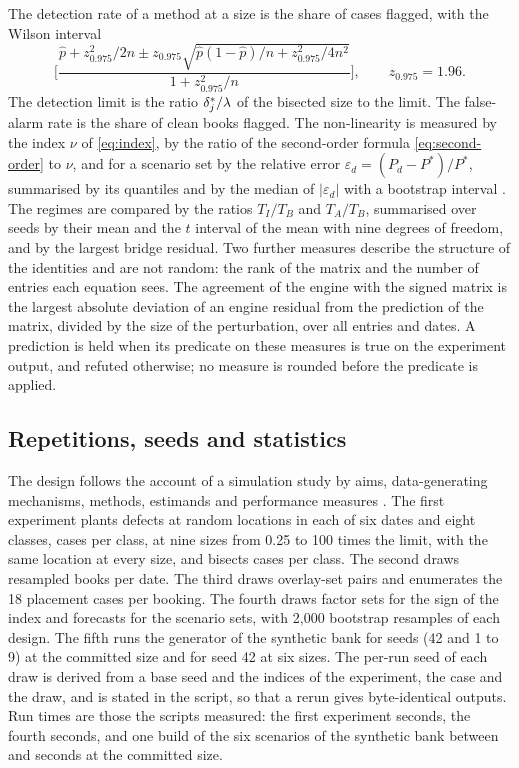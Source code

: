 The detection rate of a method at a size is the share of cases flagged, with the Wilson interval \citep{wilson1927,brown2001}
\begin{equation}
\Big[\frac{\hat p+z_{0.975}^{2}/2n\pm z_{0.975}\sqrt{\hat p(1-\hat p)/n+z_{0.975}^{2}/4n^{2}}}{1+z_{0.975}^{2}/n}\Big],\qquad z_{0.975}=1.96.
\label{eq:wilson}
\end{equation}
The detection limit is the ratio $\delta^{*}_j/\lambda$ of the bisected size to the limit.
The false-alarm rate is the share of clean books flagged.
The non-linearity is measured by the index $\nu$ of \eqref{eq:index}, by the ratio of the second-order formula \eqref{eq:second-order} to $\nu$, and for a scenario set by the relative error $\varepsilon_d=(P_d-P^{*})/P^{*}$, summarised by its quantiles and by the median of $|\varepsilon_d|$ with a bootstrap interval \citep{efron1979}.
The regimes are compared by the ratios $T_I/T_B$ and $T_A/T_B$, summarised over seeds by their mean and the $t$ interval of the mean with nine degrees of freedom, and by the largest bridge residual.
Two further measures describe the structure of the identities and are not random: the rank of the matrix and the number of entries each equation sees.
The agreement of the engine with the signed matrix is the largest absolute deviation of an engine residual from the prediction of the matrix, divided by the size of the perturbation, over all entries and dates.
A prediction is held when its predicate on these measures is true on the experiment output, and refuted otherwise; no measure is rounded before the predicate is applied.

\subsection{Repetitions, seeds and statistics}
\label{sec:design-statistics}

The design follows the account of a simulation study by aims, data-generating mechanisms, methods, estimands and performance measures \citep{morris2019}.
The first experiment plants defects at \eoneReps{} random locations in each of six dates and eight classes, \eoneCases{} cases per class, at nine sizes from 0.25 to 100 times the limit, with the same location at every size, and bisects \eoneBisected{} cases per class.
The second draws \etwoReps{} resampled books per date.
The third draws \ethreeDraws{} overlay-set pairs and enumerates the 18 placement cases per booking.
The fourth draws \efourDraws{} factor sets for the sign of the index and \efourDesignDraws{} forecasts for the scenario sets, with 2,000 bootstrap resamples of each design.
The fifth runs the generator of the synthetic bank for \efiveSeeds{} seeds (42 and 1 to 9) at the committed size and for seed 42 at six sizes.
The per-run seed of each draw is derived from a base seed and the indices of the experiment, the case and the draw, and is stated in the script, so that a rerun gives byte-identical outputs.
Run times are those the scripts measured: the first experiment \eoneSeconds{} seconds, the fourth \efourSeconds{} seconds, and one build of the six scenarios of the synthetic bank between \efiveSecLow{} and \efiveSecHigh{} seconds at the committed size.
